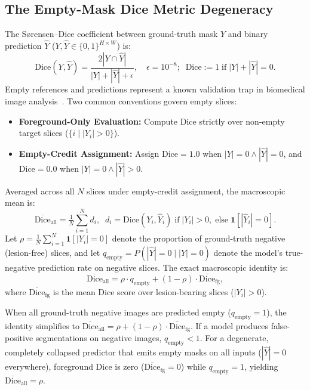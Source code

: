 \documentclass[preprint,12pt]{elsarticle}
\begin{document}
\subsection{The Empty-Mask Dice Metric Degeneracy}\label{sec:dice}
The S{\o}rensen--Dice coefficient between ground-truth mask $Y$ and binary prediction $\hat{Y}$ ($Y, \hat{Y} \in \{0, 1\}^{H \times W}$) is:
\begin{equation}
    \text{Dice}(Y, \hat{Y}) = \frac{2 |Y \cap \hat{Y}|}{|Y| + |\hat{Y}| + \epsilon}, \quad \epsilon = 10^{-8}; \;\; \text{Dice} := 1 \;\text{if}\; |Y| + |\hat{Y}| = 0.
\end{equation}
Empty references and predictions represent a known validation trap in biomedical image analysis~\cite{reinke2024metrics}. Two common conventions govern empty slices:
\begin{itemize}
    \item \textbf{Foreground-Only Evaluation:} Compute Dice strictly over non-empty target slices ($\{i \mid |Y_i| > 0\}$).
    \item \textbf{Empty-Credit Assignment:} Assign $\text{Dice} = 1.0$ when $|Y| = 0 \land |\hat{Y}| = 0$, and $\text{Dice} = 0.0$ when $|Y| = 0 \land |\hat{Y}| > 0$.
\end{itemize}
Averaged across all $N$ slices under empty-credit assignment, the macroscopic mean is:
\begin{equation}\label{eq:slice_dice}
    \overline{\text{Dice}}_{\text{all}} = \tfrac{1}{N}\textstyle\sum_{i=1}^{N} d_i, \;\; d_i = \text{Dice}(Y_i, \hat{Y}_i) \;\text{if}\; |Y_i| > 0, \;\text{else}\; \mathbf{1}\!\left[|\hat{Y}_i| = 0\right].
\end{equation}
Let $\rho = \frac{1}{N}\sum_{i=1}^N \mathbf{1}[|Y_i|=0]$ denote the proportion of ground-truth negative (lesion-free) slices, and let $q_{\text{empty}} = P(|\hat{Y}|=0 \mid |Y|=0)$ denote the model's true-negative prediction rate on negative slices. The exact macroscopic identity is:
\begin{equation}\label{eq:convex_dice}
    \overline{\text{Dice}}_{\text{all}} = \rho \cdot q_{\text{empty}} + (1 - \rho) \cdot \overline{\text{Dice}}_{\text{fg}},
\end{equation}
where $\overline{\text{Dice}}_{\text{fg}}$ is the mean Dice score over lesion-bearing slices ($|Y_i|>0$).

When all ground-truth negative images are predicted empty ($q_{\text{empty}} = 1$), the identity simplifies to $\overline{\text{Dice}}_{\text{all}} = \rho + (1 - \rho) \cdot \overline{\text{Dice}}_{\text{fg}}$. If a model produces false-positive segmentations on negative images, $q_{\text{empty}} < 1$. For a degenerate, completely collapsed predictor that emits empty masks on all inputs ($|\hat{Y}|=0$ everywhere), foreground Dice is zero ($\overline{\text{Dice}}_{\text{fg}} = 0$) while $q_{\text{empty}} = 1$, yielding $\overline{\text{Dice}}_{\text{all}} = \rho$.
\end{document}
